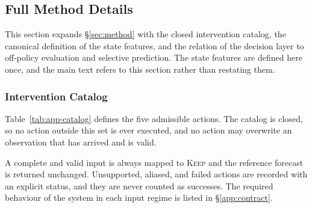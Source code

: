 \documentclass{article}
\begin{document}
\subsection{Full Method Details}
\label{app:method-details}
This section expands \S\ref{sec:method} with the closed intervention catalog, the canonical
definition of the state features, and the relation of the decision layer to off-policy
evaluation and selective prediction. The state features are defined here once, and the main
text refers to this section rather than restating them.

\subsubsection{Intervention Catalog}
\label{app:catalog}
Table~\ref{tab:app-catalog} defines the five admissible actions. The catalog is closed, so no
action outside this set is ever executed, and no action may overwrite an observation that has
arrived and is valid.

\begin{table}[h]
  \caption{The five admissible interventions. Observed entries are the entries that are
  present and valid in the reference input $X^{a_0}$, and an action that modified them would
  violate the integrity constraint of \S\ref{sec:method-problem}.}
  \label{tab:app-catalog}
  \centering
  \small
  \setlength{\tabcolsep}{4pt}
\end{table}

A complete and valid input is always mapped to \textsc{Keep} and the reference forecast is
returned unchanged. Unsupported, aliased, and failed actions are recorded with an explicit
status, and they are never counted as successes. The required behaviour of the system in each
input regime is listed in \S\ref{app:contract}.
\end{document}
